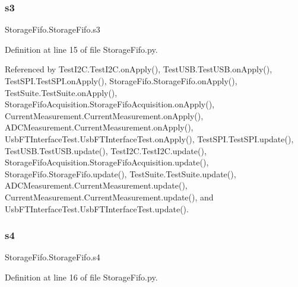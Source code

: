 \mbox{\label{classStorageFifo_1_1StorageFifo_ae1aec7880da6f8a9dc51f46db70e6d0b}} 
\subsubsection{\texorpdfstring{s3}{s3}}
{\footnotesize\ttfamily Storage\+Fifo.\+Storage\+Fifo.\+s3}



Definition at line 15 of file Storage\+Fifo.\+py.



Referenced by Test\+I2\+C.\+Test\+I2\+C.\+on\+Apply(), Test\+U\+S\+B.\+Test\+U\+S\+B.\+on\+Apply(), Test\+S\+P\+I.\+Test\+S\+P\+I.\+on\+Apply(), Storage\+Fifo.\+Storage\+Fifo.\+on\+Apply(), Test\+Suite.\+Test\+Suite.\+on\+Apply(), Storage\+Fifo\+Acquisition.\+Storage\+Fifo\+Acquisition.\+on\+Apply(), Current\+Measurement.\+Current\+Measurement.\+on\+Apply(), A\+D\+C\+Measurement.\+Current\+Measurement.\+on\+Apply(), Usb\+F\+T\+Interface\+Test.\+Usb\+F\+T\+Interface\+Test.\+on\+Apply(), Test\+S\+P\+I.\+Test\+S\+P\+I.\+update(), Test\+U\+S\+B.\+Test\+U\+S\+B.\+update(), Test\+I2\+C.\+Test\+I2\+C.\+update(), Storage\+Fifo\+Acquisition.\+Storage\+Fifo\+Acquisition.\+update(), Storage\+Fifo.\+Storage\+Fifo.\+update(), Test\+Suite.\+Test\+Suite.\+update(), A\+D\+C\+Measurement.\+Current\+Measurement.\+update(), Current\+Measurement.\+Current\+Measurement.\+update(), and Usb\+F\+T\+Interface\+Test.\+Usb\+F\+T\+Interface\+Test.\+update().

\mbox{\label{classStorageFifo_1_1StorageFifo_a6dbf6622f309aab462553f1bcc4ae8ad}} 
\subsubsection{\texorpdfstring{s4}{s4}}
{\footnotesize\ttfamily Storage\+Fifo.\+Storage\+Fifo.\+s4}



Definition at line 16 of file Storage\+Fifo.\+py.



